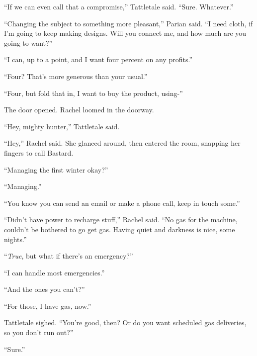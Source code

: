 ``If we can even call that a compromise,'' Tattletale said.  ``Sure.  Whatever.''



``Changing the subject to something more pleasant,'' Parian said.  ``I need cloth, if I'm going to keep making designs.  Will you connect me, and how much are you going to want?''



``I can, up to a point, and I want four percent on any profits.''



``Four?  That's more generous than your usual.''



``Four, but fold that in, I want to buy the product, using-''



The door opened.  Rachel loomed in the doorway.



``Hey, mighty hunter,'' Tattletale said.



``Hey,'' Rachel said.  She glanced around, then entered the room, snapping her fingers to call Bastard.



``Managing the first winter okay?''



``Managing.''



``You know you can send an email or make a phone call, keep in touch some.''



``Didn't have power to recharge stuff,'' Rachel said.  ``No gas for the machine, couldn't be bothered to go get gas.  Having quiet and darkness is nice, some nights.''



``\emph{True}, but what if there's an emergency?''



``I can handle most emergencies.''



``And the ones you can't?''



``For those, I have gas, now.''



Tattletale sighed.  ``You're good, then?  Or do you want scheduled gas deliveries, so you don't run out?''



``Sure.''



